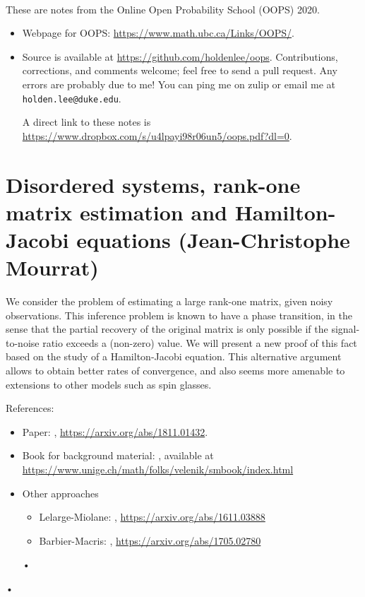 
~

These are notes from the Online Open Probability School (OOPS) 2020. 
\begin{itemize}
\item
Webpage for OOPS: \url{https://www.math.ubc.ca/Links/OOPS/}.
\item
Source is available at \url{https://github.com/holdenlee/oops}. Contributions, corrections, and comments welcome; feel free to send a pull request. Any errors are probably due to me! You can ping me on zulip or email me at \texttt{holden.lee@duke.edu}.

A direct link to these notes is \url{https://www.dropbox.com/s/u4lpayi98r06un5/oops.pdf?dl=0}.
\end{itemize}

\section{Disordered systems, rank-one matrix estimation and Hamilton-Jacobi equations (Jean-Christophe Mourrat)}

We consider the problem of estimating a large rank-one matrix, given noisy observations. This inference problem is known to have a phase transition, in the sense that the partial recovery of the original matrix is only possible if the signal-to-noise ratio exceeds a (non-zero) value. We will present a new proof of this fact based on the study of a Hamilton-Jacobi equation. This alternative argument allows to obtain better rates of convergence, and also seems more amenable to extensions to other models such as spin glasses. 

References:
\begin{itemize}
\item
Paper: \cite{mourrat2018hamilton}, \url{https://arxiv.org/abs/1811.01432}.
\item
Book for background material: \cite{friedli2017statistical}, available at \url{https://www.unige.ch/math/folks/velenik/smbook/index.html}
\item Other approaches
\begin{itemize}
\item
Lelarge-Miolane: \cite{lelarge2019fundamental}, \url{https://arxiv.org/abs/1611.03888}
\item 
Barbier-Macris: \cite{barbier2019adaptive}, \url{https://arxiv.org/abs/1705.02780}
\end{itemize}•
\end{itemize}• 

